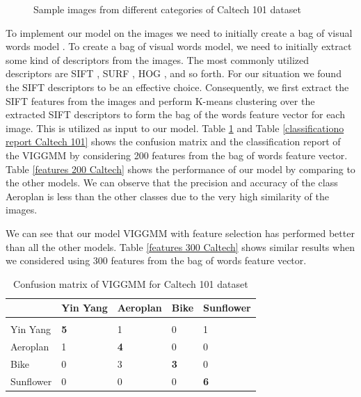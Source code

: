 \documentclass[letterpaper]{article}
\begin{document}
\begin{figure}[h!]
\caption{Sample images from different categories of Caltech 101 dataset}
    \label{figure1}
\end{figure}

To implement our model on the images we need to initially create a bag of visual words model \cite{li2010contextual}\cite{csurka2004visual}. 
To create a bag of visual words model, we need to initially extract some kind of descriptors from the images. The most commonly utilized descriptors are SIFT \cite{lowe2004distinctive}, 
SURF \cite{bay2008speeded}, HOG \cite{dalal2005histograms}, and so forth. For our situation we found the SIFT 
descriptors to be an effective choice. Consequently, we first extract 
the SIFT features from the images and perform K-means 
clustering over the extracted SIFT descriptors to form the bag of the words feature vector for each image. This is utilized as input to our model. 
Table \ref{confusion Caltech} and Table \ref{classificationo report Caltech 101} shows the confusion matrix and the classification report of the VIGGMM by considering 200 features from the bag of words feature vector. 
Table \ref{features 200 Caltech} shows the performance of our model by comparing to the other
models.
We can observe that the precision and accuracy of the class Aeroplan is less than the other classes due to the very high similarity of the images.

We can see that our model VIGGMM with feature selection has performed better than all the other models. Table \ref{features 300 Caltech} shows similar results when we considered using 300 features from the bag of words feature vector.





\begin{table}
    \caption{Confusion matrix of VIGGMM for Caltech 101 dataset }
    \label{confusion Caltech}
    \centering
    \resizebox{\columnwidth}{!}
    {%
    \begin{tabular}{lllll}
        \multicolumn{1}{c}{\bf }  &\multicolumn{1}{c}{\bf Yin Yang}&\multicolumn{1}{c}{\bf Aeroplan}&\multicolumn{1}{c}{\bf Bike} &\multicolumn{1}{c}{\bf Sunflower}   \\
        \hline \\
        Yin Yang         &\textbf{5} &1&0&1 \\
        Aeroplan             &1  &\textbf{4}&0&0\\
        Bike             &0  &3&\textbf{3}&0\\
        Sunflower             &0  &0&0&\textbf{6}\\
        \end{tabular}
    }
\end{table}
\end{document}
